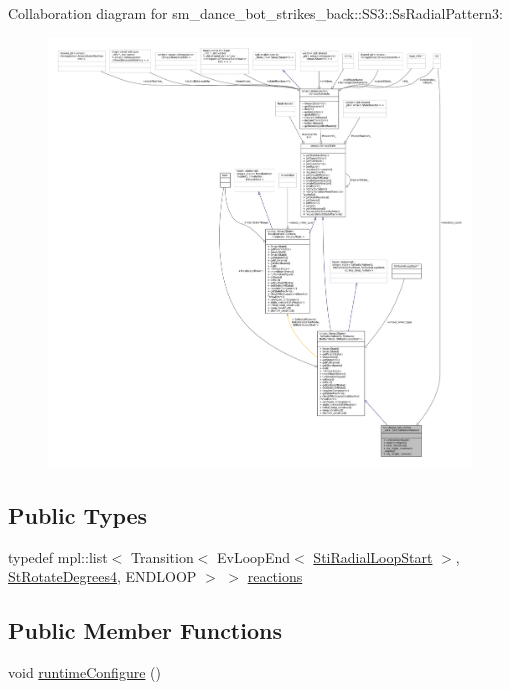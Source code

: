 Collaboration diagram for sm\+\_\+dance\+\_\+bot\+\_\+strikes\+\_\+back\+:\+:S\+S3\+:\+:Ss\+Radial\+Pattern3\+:
\nopagebreak
\begin{figure}[H]
\begin{center}
\leavevmode
\includegraphics[width=350pt]{structsm__dance__bot__strikes__back_1_1SS3_1_1SsRadialPattern3__coll__graph}
\end{center}
\end{figure}
\subsection*{Public Types}
\begin{DoxyCompactItemize}
\item 
typedef mpl\+::list$<$ Transition$<$ Ev\+Loop\+End$<$ \hyperlink{structsm__dance__bot__strikes__back_1_1radial__motion__states_1_1StiRadialLoopStart}{Sti\+Radial\+Loop\+Start} $>$, \hyperlink{structsm__dance__bot__strikes__back_1_1StRotateDegrees4}{St\+Rotate\+Degrees4}, E\+N\+D\+L\+O\+OP $>$ $>$ \hyperlink{structsm__dance__bot__strikes__back_1_1SS3_1_1SsRadialPattern3_a60083a930035dd05be3e82d8fe8fb7d1}{reactions}
\end{DoxyCompactItemize}
\subsection*{Public Member Functions}
\begin{DoxyCompactItemize}
\item 
void \hyperlink{structsm__dance__bot__strikes__back_1_1SS3_1_1SsRadialPattern3_a11c942aec9ce2713e2fbaf02095307ac}{runtime\+Configure} ()
\end{DoxyCompactItemize}
